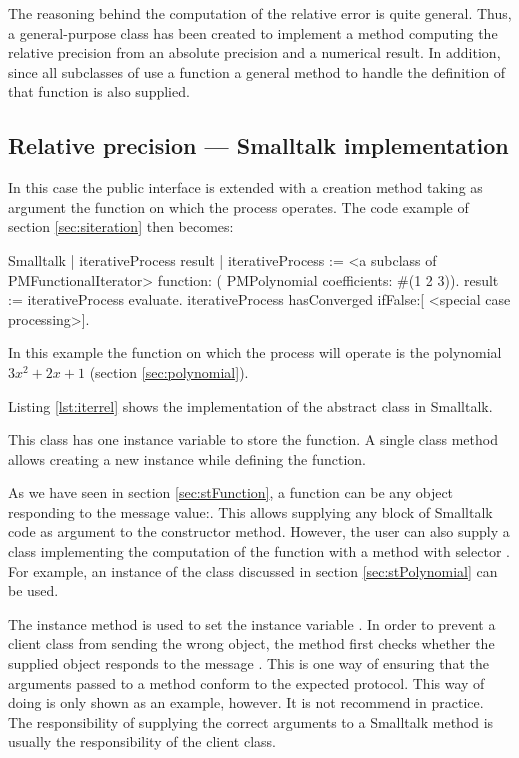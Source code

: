 The reasoning behind the computation of the relative error is
quite general. Thus, a general-purpose class  has been created to implement a method
computing the relative precision from an absolute precision and a
numerical result. In addition, since all subclasses of  use a function a general method to handle the
definition of that function is also supplied.

\subsection{Relative precision --- Smalltalk  implementation}
\label{sec:siterrel} In this case the public interface is extended
with a creation method taking as argument the function on which
the process operates.
The code example of section \ref{sec:siteration} then becomes:
\begin{displaycode}{Smalltalk}
| iterativeProcess result |
iterativeProcess := <a subclass of PMFunctionalIterator>
                  function: ( PMPolynomial coefficients: #(1 2 3)).
result := iterativeProcess evaluate.
iterativeProcess hasConverged ifFalse:[ <special case processing>].
\end{displaycode}
In this example the function on which the process will operate is
the polynomial $3x^2+2x+1$ (\cf section \ref{sec:polynomial}).

Listing \ref{lst:iterrel} shows the implementation of the abstract class  in Smalltalk.

This class has one instance variable  to store the function.
A single class method allows creating a new instance while defining the function.

As we have seen in section \ref{sec:stFunction}, a function can be
any object responding to the message value:. This allows supplying
any block of Smalltalk code as argument to the constructor method.
However, the user can also supply a class implementing the
computation of the function with a method with selector . For example, an instance of the class 
discussed in section \ref{sec:stPolynomial} can be used.

The instance method  is used to set the instance
variable . In order to prevent a client class
from sending the wrong object, the method first checks whether the
supplied object responds to the message . This is one
way of ensuring that the arguments passed to a method conform to
the expected protocol. This way of doing is only shown as an
example, however. It is not recommend in practice. The
responsibility of supplying the correct arguments to a Smalltalk
method is usually the responsibility of the client class.

